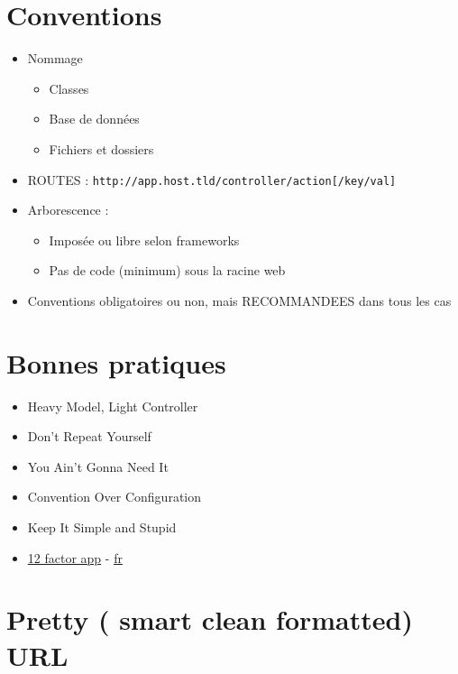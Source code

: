\hypertarget{conventions}{%
\section{Conventions}\label{conventions}}

\begin{itemize}
\tightlist
\item
  Nommage

  \begin{itemize}
  \tightlist
  \item
    Classes
  \item
    Base de données
  \item
    Fichiers et dossiers
  \end{itemize}
\item
  ROUTES :
  \textenglish{\texttt{http://app.host.tld/controller/action{[}/key/val{]}}}
\item
  Arborescence :

  \begin{itemize}
  \tightlist
  \item
    Imposée ou libre selon frameworks
  \item
    Pas de code (minimum) sous la racine web
  \end{itemize}
\item
  Conventions obligatoires ou non, mais RECOMMANDEES dans tous les cas
\end{itemize}

\hypertarget{bonnes-pratiques}{%
\section{Bonnes pratiques}\label{bonnes-pratiques}}

\begin{itemize}
\tightlist
\item
  Heavy Model, Light Controller
\item
  Don't Repeat Yourself
\item
  You Ain't Gonna Need It
\item
  Convention Over Configuration
\item
  Keep It Simple and Stupid
\item
  \href{https://12factor.net/}{12 factor app} -
  \href{https://12factor.net/fr/}{fr}
\end{itemize}

\hypertarget{pretty-smart-clean-formatted-url}{%
\section{Pretty ( \textbar{} smart \textbar{} clean \textbar{}
formatted) URL}\label{pretty-smart-clean-formatted-url}}

